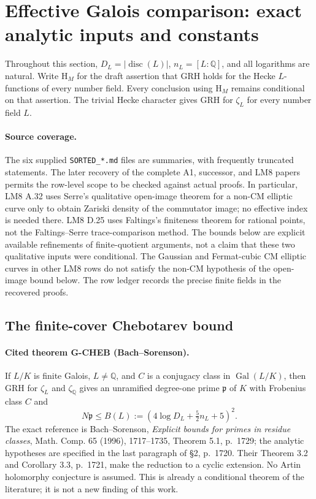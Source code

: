 \section{Effective Galois comparison: exact analytic inputs and constants}
\label{sec:effective-galois}

Throughout this section, $D_L=|\operatorname{disc}(L)|$, $n_L=[L:\mathbb Q]$, and all logarithms are natural.  Write $\mathrm{H}_M$ for the draft assertion that GRH holds for the Hecke $L$-functions of every number field.  Every conclusion using $\mathrm{H}_M$ remains conditional on that assertion.  The trivial Hecke character gives GRH for $\zeta_L$ for every number field $L$.

\paragraph{Source coverage.}
The six supplied \texttt{SORTED\_*.md} files are summaries, with frequently truncated statements.  The later recovery of the complete A1, successor, and LM8 papers permits the row-level scope to be checked against actual proofs.  In particular, LM8 A.32 uses Serre's qualitative open-image theorem for a non-CM elliptic curve only to obtain Zariski density of the commutator image; no effective index is needed there.  LM8 D.25 uses Faltings's finiteness theorem for rational points, not the Faltings--Serre trace-comparison method.  The bounds below are explicit available refinements of finite-quotient arguments, not a claim that these two qualitative inputs were conditional.  The Gaussian and Fermat-cubic CM elliptic curves in other LM8 rows do not satisfy the non-CM hypothesis of the open-image bound below.  The row ledger records the precise finite fields in the recovered proofs.

\subsection{The finite-cover Chebotarev bound}

\paragraph{Cited theorem G-CHEB (Bach--Sorenson).}
If $L/K$ is finite Galois, $L\ne\mathbb Q$, and $C$ is a conjugacy class in $\operatorname{Gal}(L/K)$, then GRH for $\zeta_L$ and $\zeta_{\mathbb Q}$ gives an unramified degree-one prime $\mathfrak p$ of $K$ with Frobenius class $C$ and
\[
 N\mathfrak p\le B(L):=(4\log D_L+\tfrac52 n_L+5)^2.
\]
The exact reference is Bach--Sorenson, \emph{Explicit bounds for primes in residue classes}, Math. Comp. 65 (1996), 1717--1735, Theorem 5.1, p.~1729; the analytic hypotheses are specified in the last paragraph of \S2, p.~1720.  Their Theorem 3.2 and Corollary 3.3, p.~1721, make the reduction to a cyclic extension.  No Artin holomorphy conjecture is assumed.  This is already a conditional theorem of the literature; it is not a new finding of this work.

